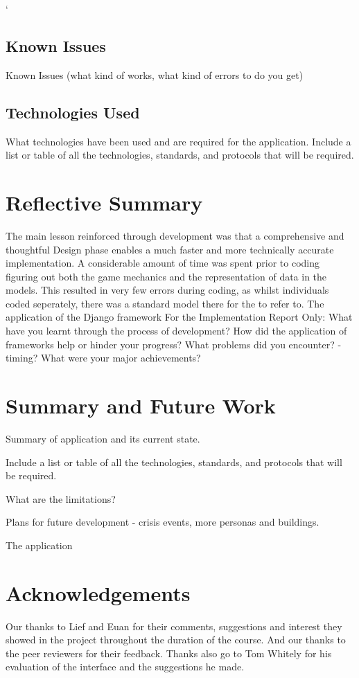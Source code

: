 `\documentclass{sig-alt-release2}
\begin{document}
\subsection{Known Issues}

Known Issues (what kind of works, what kind of errors to do you get)

\subsection{Technologies Used}

What technologies have been used and are required for the application. Include a list or table of all the technologies, standards, and protocols that will be required.

\section{Reflective Summary}

The main lesson reinforced through development was that a comprehensive and thoughtful Design phase enables a much faster and more technically accurate implementation. A considerable amount of time was spent prior to coding figuring out both the game mechanics and the representation of data in the models. This resulted in very few errors during coding, as whilst individuals coded seperately, there was a standard model there for the to refer to.
The application of the Django framework 
For the Implementation Report Only:
What have you learnt through the process of development? 
How did the application of frameworks help or hinder your progress?
What problems did you encounter? - timing?
What were your major achievements?


\section{Summary and Future Work}

Summary of application and its current state.

Include a list or table of all the technologies, standards, and protocols that will be required.

What are the limitations?

Plans for future development - crisis events, more personas and buildings.

The application 

\section{Acknowledgements}
Our thanks to Lief and Euan for their comments, suggestions and interest they showed in the project throughout the duration of the course. And our thanks to the peer reviewers for their feedback.
Thanks also go to Tom Whitely for his evaluation of the interface and the suggestions he made.



\end{document}
